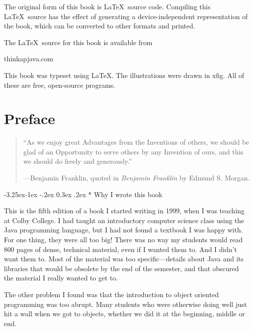 \documentclass{book}
\makeatletter
\renewcommand\subsection{\@startsection {subsection}{2}{0mm}%
    {-3.25ex\@plus -1ex \@minus -.2ex}%
    {0.3ex \@plus .2ex}%
    {\normalfont\large\bfseries}}
\makeatother
\begin{document}
The original form of this book is \LaTeX\ source code.  Compiling this
\LaTeX\ source has the effect of generating a device-independent
representation of the book, which can be converted to other formats
and printed.

The \LaTeX\ source for this book is available from

\begin{verbatimtab}
      thinkapjava.com
\end{verbatimtab}

This book was typeset using \LaTeX .  The illustrations were
drawn in xfig.  All of these are free, open-source programs.

\vspace{0.25in}



\chapter{Preface}

\begin{quote}
``As we enjoy great Advantages from the Inventions of others,
we should be glad of an Opportunity to serve others by any
Invention of ours, and this we should do freely and generously.''

---Benjamin Franklin, quoted in {\em Benjamin Franklin} by
Edmund S. Morgan.
\end{quote}

\subsection* {Why I wrote this book}

This is the fifth edition of a book I started writing in 1999,
when I was teaching at Colby College.  I had taught an introductory
computer science class using the Java programming language, but I
had not found a textbook I was happy with.  For one thing,
they were all too big!  There was no way my students would read
800 pages of dense, technical material, even if I wanted them to.
And I didn't want them to.  Most of the material was too
specific---details about Java and its libraries that would be obsolete
by the end of the semester, and that obscured the material I really
wanted to get to.

The other problem I found was that the introduction to object
oriented programming was too abrupt.  Many students who were otherwise
doing well just hit a wall when we got to objects, whether we did
it at the beginning, middle or end.
\end{document}
